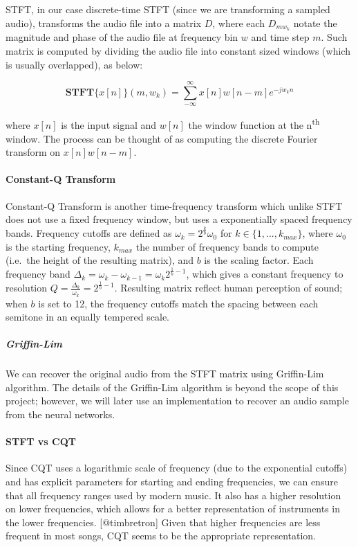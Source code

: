 \documentclass[12pt,a4paper,]{report}
\begin{document}
STFT, in our case discrete-time STFT (since we are transforming a
sampled audio), transforms the audio file into a matrix \(D\), where
each \(D_{mw_{k}}\) notate the magnitude and phase of the audio file at
frequency bin \(w\) and time step \(m\). Such matrix is computed by
dividing the audio file into constant sized windows (which is usually
overlapped), as below:

\begin{equation}
    \mathbf{STFT}\{x[n]\}(m, w_k) = \sum_{-\infty}^{\infty} x[n]w[n - m]e^{-jw_kn}
\end{equation}

where \(x[n]\) is the input signal and \(w[n]\) the window function at
the n\textsuperscript{th} window. The process can be thought of as
computing the discrete Fourier transform on \(x[n]w[n - m]\).

\paragraph{Constant-Q Transform}

Constant-Q Transform is another time-frequency transform which unlike
STFT does not use a fixed frequency window, but uses a exponentially
spaced frequency bands. Frequency cutoffs are defined as
\(\omega_k = 2^{\frac{k}{b}} \omega_0\) for
\(k \in \{ 1, ..., k_{max}\}\), where \(\omega_0\) is the starting
frequency, \(k_{max}\) the number of frequency bands to compute
(i.e.~the height of the resulting matrix), and \(b\) is the scaling
factor. Each frequency band
\(\Delta_k = \omega_k - \omega_{k-1} = \omega_k 2^{\frac{1}{b} - 1}\),
which gives a constant frequency to resolution
\(Q = \frac{\Delta_k}{\omega_k} = 2^{\frac{1}{b} -1}\). Resulting matrix
reflect human perception of sound; when \(b\) is set to 12, the
frequency cutoffs match the spacing between each semitone in an equally
tempered scale.

\subparagraph{Griffin-Lim}

We can recover the original audio from the STFT matrix using Griffin-Lim
algorithm. The details of the Griffin-Lim algorithm is beyond the scope
of this project; however, we will later use an implementation to recover
an audio sample from the neural networks.

\paragraph{STFT vs CQT}

Since CQT uses a logarithmic scale of frequency (due to the exponential
cutoffs) and has explicit parameters for starting and ending
frequencies, we can ensure that all frequency ranges used by modern
music. It also has a higher resolution on lower frequencies, which
allows for a better representation of instruments in the lower
frequencies. {[}@timbretron{]} Given that higher frequencies are less
frequent in most songs, CQT seems to be the appropriate representation.
\end{document}
